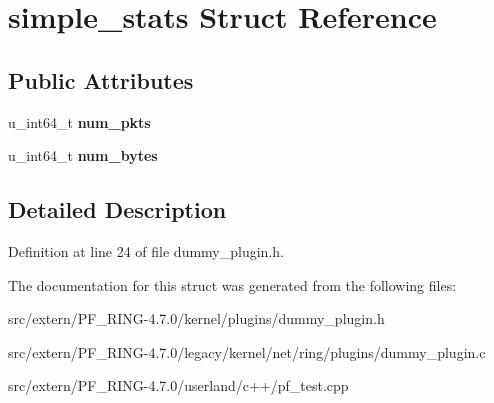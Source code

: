\hypertarget{structsimple__stats}{
\section{simple\_\-stats Struct Reference}
\label{structsimple__stats}
}
\subsection*{Public Attributes}
\begin{DoxyCompactItemize}
\item 
\hypertarget{structsimple__stats_af6b368054e18c19bcb087420324e5b9e}{
u\_\-int64\_\-t {\bfseries num\_\-pkts}}
\label{structsimple__stats_af6b368054e18c19bcb087420324e5b9e}

\item 
\hypertarget{structsimple__stats_a6518f3f3276ddf00c4c6d4e364749748}{
u\_\-int64\_\-t {\bfseries num\_\-bytes}}
\label{structsimple__stats_a6518f3f3276ddf00c4c6d4e364749748}

\end{DoxyCompactItemize}


\subsection{Detailed Description}


Definition at line 24 of file dummy\_\-plugin.h.



The documentation for this struct was generated from the following files:\begin{DoxyCompactItemize}
\item 
src/extern/PF\_\-RING-\/4.7.0/kernel/plugins/dummy\_\-plugin.h\item 
src/extern/PF\_\-RING-\/4.7.0/legacy/kernel/net/ring/plugins/dummy\_\-plugin.c\item 
src/extern/PF\_\-RING-\/4.7.0/userland/c++/pf\_\-test.cpp\end{DoxyCompactItemize}
